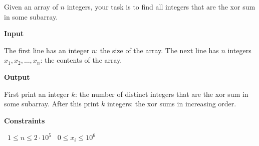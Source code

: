 Given an array of $n$ integers, your task is to find all integers that are the xor sum in some subarray.

\vspace{0.3cm}\noindent\textbf{Input}

The first line has an integer $n$: the size of the array.
The next line has $n$ integers $x_1,x_2,\dots,x_n$: the contents of the array.

\vspace{0.3cm}\noindent\textbf{Output}

First print an integer $k$: the number of distinct integers that are the xor sum in some subarray.
After this print $k$ integers: the xor sums in increasing order.

\vspace{0.3cm}\noindent\textbf{Constraints}

\textbullet\ $1 \le n \le 2 \cdot 10^5$
\textbullet\ $0 \le x_i \le 10^6$